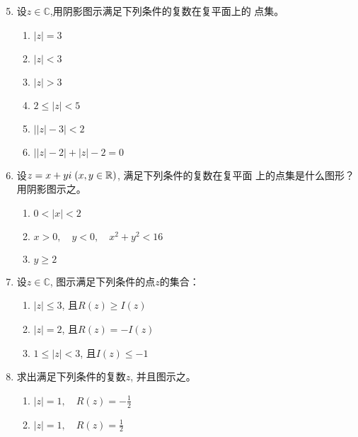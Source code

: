 \begin{enumerate}\setcounter{enumi}{4}
   \item 设$z\in\mathbb{C}$,用阴影图示满足下列条件的复数在复平面上的
   点集。
\begin{multicols}{2}
\begin{enumerate}[(1)]
    \item   $|z| = 3$
    \item $|z| < 3$
    \item $ |z| > 3$
  \item  $ 2\leqslant | z| < 5$ 
  \item $ \big|| z| - 3\big| < 2$
   \item $\big||z|-2\big| +|z|-2=0$
\end{enumerate}    
\end{multicols}

 \item 设$z=x+yi\; (x,y\in \mathbb{R})$, 满足下列条件的复数在复平面
   上的点集是什么图形？用阴影图示之。
\begin{multicols}{2}
\begin{enumerate}[(1)]
    \item  $0< | x| < 2$
    \item $x> 0,\quad y< 0,\quad x^{2}+ y^{2}< 16$
   \item    $y\geqslant 2$
\end{enumerate}
\end{multicols}
  
  \item  设$z\in\mathbb{C}$, 图示满足下列条件的点$z$的集合：
\begin{multicols}{2}
\begin{enumerate}[(1)]
    \item $|z|\leqslant3$, 且$R(z)\geqslant I(z)$
    \item $|z|=2$, 且$R(z)=-I(z)$
    \item $1\leqslant|z|<3$, 且$I(z)\leqslant-1$
\end{enumerate}
\end{multicols}

   \item 求出满足下列条件的复数$z$, 并且图示之。
\begin{multicols}{2}
\begin{enumerate}[(1)]
\item  $| z| = 1,\quad R( z) = -\frac 12$ 
\item  $| z| = 1,\quad R( z)= \frac 12$
\end{enumerate}
\end{multicols}
\end{enumerate}

